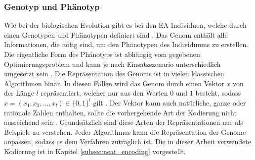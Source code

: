 \subsubsection{Genotyp und Phänotyp}
Wie bei der biologischen Evolution gibt es bei den \ac{EA} Individuen, welche durch einen Genotypen und Phänotypen definiert sind \cite{weicker2015evolutionare}. Das Genom enthält alle Informationen, die nötig sind, um den Phänotypen des Individuums zu erstellen. Die eigentliche Form des Phänotyps ist abhängig vom gegebenen Optimierungsproblem und kann je nach Einsatzszenario unterschiedlich umgesetzt sein \cite{rothlauf2006representation}. Die Repräsentation des Genoms ist in vielen klassischen Algorithmen binär. In diesen Fällen wird das Genom durch einen Vektor $x$ von der Länge $l$ repräsentiert, welcher nur aus den Werten $0$ und $1$ besteht, sodass $x= (x_1, x_2, ..., x_l) \in \{0, 1\}^l$ gilt \cite{rothlauf2006representation}. Der Vektor kann auch natürliche, ganze oder rationale Zahlen enthalten, sollte die vorhergehende Art der Kodierung nicht ausreichend sein \cite{rothlauf2006representation}. Grundsätzlich sind diese Arten der Repräsentationen nur als Beispiele zu verstehen. Jeder Algorithmus kann die Repräsentation der Genome anpassen, sodass es dem Verfahren zuträglich ist. Die in dieser Arbeit verwendete Kodierung ist in Kapitel \ref{subsec:neat_encoding} vorgestellt. 

